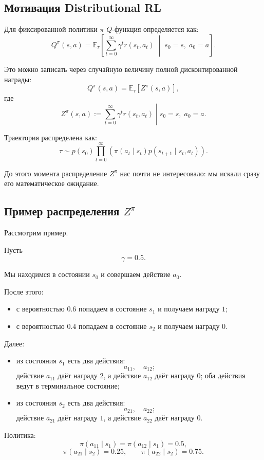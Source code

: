 \documentclass[12pt,a4paper]{article}
\begin{document}
\subsection{Мотивация Distributional RL}

Для фиксированной политики $\pi$ $Q$-функция определяется как:
\[
Q^\pi(s,a)
=
\mathbb E_\tau
\left[
\sum_{t=0}^{\infty}
\gamma^t r(s_t,a_t)
\;\middle|\;
s_0=s,\;a_0=a
\right].
\]

Это можно записать через случайную величину полной дисконтированной награды:
\[
Q^\pi(s,a)
=
\mathbb E_\tau
\left[
Z^\pi(s,a)
\right],
\]
где
\[
Z^\pi(s,a)
:=
\left.
\sum_{t=0}^{\infty}
\gamma^t r(s_t,a_t)
\;\right|\;
s_0=s,\;a_0=a.
\]

Траектория распределена как:
\[
\tau
\sim
p(s_0)
\prod_{t=0}^{\infty}
\left(
\pi(a_t\mid s_t)
p(s_{t+1}\mid s_t,a_t)
\right).
\]

До этого момента распределение $Z^\pi$ нас почти не интересовало: мы искали сразу его математическое ожидание.

\subsection{Пример распределения $Z^\pi$}

Рассмотрим пример.

Пусть
\[
\gamma = 0.5.
\]

Мы находимся в состоянии $s_0$ и совершаем действие $a_0$.

После этого:
\begin{itemize}
    \item с вероятностью $0.6$ попадаем в состояние $s_1$ и получаем награду $1$;
    \item с вероятностью $0.4$ попадаем в состояние $s_2$ и получаем награду $0$.
\end{itemize}

Далее:
\begin{itemize}
    \item из состояния $s_1$ есть два действия:
    \[
    a_{11},\quad a_{12};
    \]
    действие $a_{11}$ даёт награду $2$, а действие $a_{12}$ даёт награду $0$; оба действия ведут в терминальное состояние;

    \item из состояния $s_2$ есть два действия:
    \[
    a_{21},\quad a_{22};
    \]
    действие $a_{21}$ даёт награду $1$, а действие $a_{22}$ даёт награду $0$.
\end{itemize}

Политика:
\[
\pi(a_{11}\mid s_1)
=
\pi(a_{12}\mid s_1)
=
0.5,
\]
\[
\pi(a_{21}\mid s_2)
=
0.25,
\qquad
\pi(a_{22}\mid s_2)
=
0.75.
\]
\end{document}
